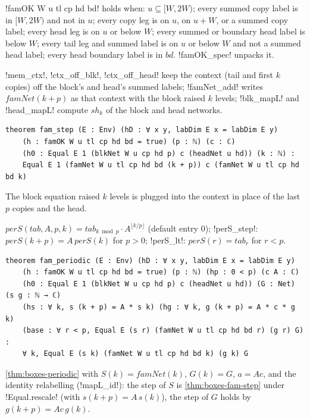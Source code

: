 {\begin{definition}\label{def:boxes-famOK}
\lbx!famOK W u tl cp hd bd! holds when: $u\subseteq[W,2W)$; every summed copy label is in $[W,2W)$ and not in $u$; every copy leg is on $u$, on $u+W$, or a summed copy label; every head leg is on $u$ or below $W$; every summed or boundary head label is below $W$; every tail leg and summed label is on $u$ or below $W$ and not a summed head label; every head boundary label is in $\mathit{bd}$. \lbx!famOK_spec! unpacks it.
\end{definition}
\lbx!mem_ctx!, \lbx!ctx_off_blk!, \lbx!ctx_off_head! keep the context (tail and first $k$ copies) off the block's and head's summed labels; \lbx!famNet_add! writes $\mathit{famNet}(k+p)$ as that context with the block raised $k$ levels; \lbx!blk_mapL! and \lbx!head_mapL! compute $\mathit{sh}_k$ of the block and head networks.

\begin{theorem}\label{thm:boxes-fam-step}
\begin{lstlisting}[style=leanbox]
theorem fam_step (E : Env) (hD : ∀ x y, labDim E x = labDim E y)
    (h : famOK W u tl cp hd bd = true) (p : ℕ) (c : ℂ)
    (h0 : Equal E 1 (blkNet W u cp hd p) c (headNet u hd)) (k : ℕ) :
    Equal E 1 (famNet W u tl cp hd bd (k + p)) c (famNet W u tl cp hd bd k)
\end{lstlisting}
\end{theorem}
\noindent The block equation raised $k$ levels is plugged into the context in place of the last $p$ copies and the head.

\begin{definition}\label{def:boxes-perS}
$\mathit{perS}(\mathit{tab},A,p,k)=\mathit{tab}_{k\bmod p}\cdot A^{\lfloor k/p\rfloor}$ (default entry $0$); \lbx!perS_step!: $\mathit{perS}(k+p)=A\,\mathit{perS}(k)$ for $p>0$; \lbx!perS_lt!: $\mathit{perS}(r)=\mathit{tab}_r$ for $r<p$.
\end{definition}

\begin{theorem}\label{thm:boxes-fam-periodic}
\begin{lstlisting}[style=leanbox]
theorem fam_periodic (E : Env) (hD : ∀ x y, labDim E x = labDim E y)
    (h : famOK W u tl cp hd bd = true) (p : ℕ) (hp : 0 < p) (c A : ℂ)
    (h0 : Equal E 1 (blkNet W u cp hd p) c (headNet u hd)) (G : Net) (s g : ℕ → ℂ)
    (hs : ∀ k, s (k + p) = A * s k) (hg : ∀ k, g (k + p) = A * c * g k)
    (base : ∀ r < p, Equal E (s r) (famNet W u tl cp hd bd r) (g r) G) :
    ∀ k, Equal E (s k) (famNet W u tl cp hd bd k) (g k) G
\end{lstlisting}
\end{theorem}
\noindent \cref{thm:boxes-periodic} with $S(k)=\mathit{famNet}(k)$, $G(k)=G$, $a=Ac$, and the identity relabelling (\lbx!mapL_id!): the step of $S$ is \cref{thm:boxes-fam-step} under \lbx!Equal.rescale! (with $s(k+p)=A\,s(k)$), the step of $G$ holds by $g(k+p)=Ac\,g(k)$.

}
